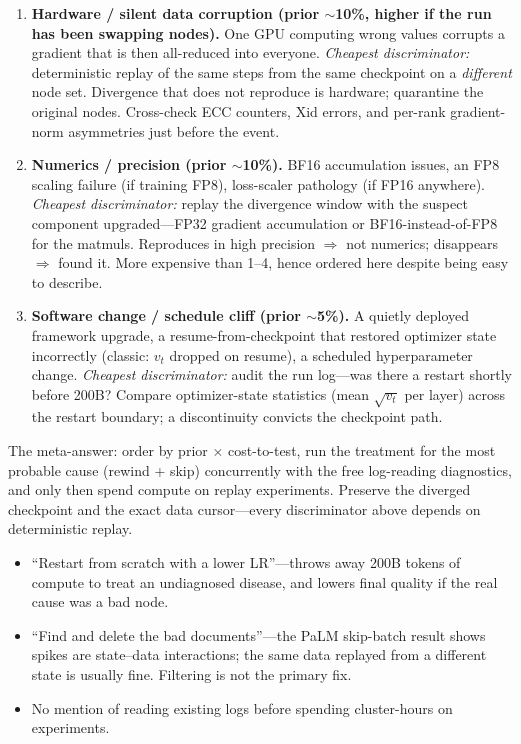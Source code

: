 \begin{interviewq}
\begin{enumerate}
    \item \textbf{Hardware / silent data corruption (prior $\sim$10\%, higher if the run has been swapping nodes).} One GPU computing wrong values corrupts a gradient that is then all-reduced into everyone. \textit{Cheapest discriminator:} deterministic replay of the same steps from the same checkpoint on a \emph{different} node set. Divergence that does not reproduce is hardware; quarantine the original nodes. Cross-check ECC counters, Xid errors, and per-rank gradient-norm asymmetries just before the event.

    \item \textbf{Numerics / precision (prior $\sim$10\%).} BF16 accumulation issues, an FP8 scaling failure (if training FP8), loss-scaler pathology (if FP16 anywhere). \textit{Cheapest discriminator:} replay the divergence window with the suspect component upgraded---FP32 gradient accumulation or BF16-instead-of-FP8 for the matmuls. Reproduces in high precision $\Rightarrow$ not numerics; disappears $\Rightarrow$ found it. More expensive than 1--4, hence ordered here despite being easy to describe.

    \item \textbf{Software change / schedule cliff (prior $\sim$5\%).} A quietly deployed framework upgrade, a resume-from-checkpoint that restored optimizer state incorrectly (classic: $v_t$ dropped on resume), a scheduled hyperparameter change. \textit{Cheapest discriminator:} audit the run log---was there a restart shortly before 200B? Compare optimizer-state statistics (mean $\sqrt{v_t}$ per layer) across the restart boundary; a discontinuity convicts the checkpoint path.
\end{enumerate}

The meta-answer: order by prior $\times$ cost-to-test, run the treatment for the most probable cause (rewind + skip) concurrently with the free log-reading diagnostics, and only then spend compute on replay experiments. Preserve the diverged checkpoint and the exact data cursor---every discriminator above depends on deterministic replay.

\redflags
\begin{itemize}
    \item ``Restart from scratch with a lower LR''---throws away 200B tokens of compute to treat an undiagnosed disease, and lowers final quality if the real cause was a bad node.
    \item ``Find and delete the bad documents''---the PaLM skip-batch result shows spikes are state--data interactions; the same data replayed from a different state is usually fine. Filtering is not the primary fix.
    \item No mention of reading existing logs before spending cluster-hours on experiments.
\end{itemize}


\end{interviewq}
